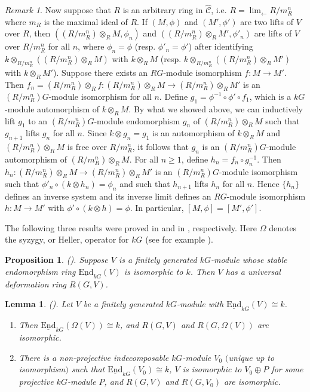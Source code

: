 \documentclass{amsart}
\theoremstyle{plain}
\newtheorem{prop}[thm]{Proposition}
\newtheorem{lemma}[thm]{Lemma}
\theoremstyle{definition}
\theoremstyle{remark}
\newtheorem{rem}[thm]{Remark}
\begin{document}
\begin{rem}
Now suppose that $R$ is an arbitrary ring in $\hat{\mathcal{C}}$, i.e.
$R=\displaystyle\lim_{\longleftarrow} R/m_R^n$ where $m_R$ is the
maximal ideal of $R$. If $(M,\phi)$ and $(M',\phi')$ are two lifts of $V$ over $R$, then
$((R/m_R^n)\otimes_RM,\phi_n)$ and $((R/m_R^n)\otimes_RM',\phi'_n)$ are lifts of $V$ over
$R/m_R^n$ for all $n$, where $\phi_n=\phi$ (resp. $\phi'_n=\phi'$)
after identifying $k\otimes_{R/m_R^n}((R/m_R^n)\otimes_R M)$ with $k\otimes_R M$ (resp.
$k\otimes_{R/m_R^n}((R/m_R^n)\otimes_R M')$ with $k\otimes_R M'$). 
Suppose there exists an $RG$-module isomorphism $f:M\to M'$. Then 
$f_n=(R/m_R^n)\otimes_Rf:(R/m_R^n)\otimes_RM\to (R/m_R^n)\otimes_RM'$ is an 
$(R/m_R^n)G$-module isomorphism for all $n$.
Define $g_1=\phi^{-1}\circ\phi'\circ f_1$, which is a $kG$-module automorphism of $k\otimes_RM$.
By what we showed above, we can inductively lift $g_1$ to an $(R/m_R^n)G$-module endomorphism
$g_n$ of $(R/m_R^n)\otimes_R M$ such that $g_{n+1}$ lifts $g_n$ for all $n$. Since $k\otimes g_n
=g_1$ is an automorphism of $k\otimes_R M$ and $(R/m_R^n)\otimes_R M$ is free over $R/m_R^n$, 
it follows that
$g_n$ is an $(R/m_R^n)G$-module automorphism of $(R/m_R^n)\otimes_R M$. For all $n\ge 1$, define
$h_n=f_n\circ g_n^{-1}$. Then $h_n: (R/m_R^n)\otimes_RM\to (R/m_R^n)\otimes_RM'$ is an 
$(R/m_R^n)G$-module isomorphism such that $\phi'_n\circ (k\otimes h_n)= \phi_n$
and such that $h_{n+1}$ lifts $h_n$ for all $n$. Hence $\{h_n\}$
defines an inverse system and its inverse limit defines an $RG$-module isomorphism
$h:M\to M'$ with $\phi'\circ (k\otimes h)=\phi$. In particular, $[M,\phi]=[M',\phi']$.
\end{rem}

The following three results were proved in \cite{bc} and in \cite{3sim}, respectively. 
Here $\Omega$ denotes
the syzygy, or Heller, operator for $kG$ (see for example \cite[\S 20]{alp}).

\begin{prop}
\label{prop:stablendudr}
{\rm (\cite[Prop. 2.1]{bc}).}
Suppose $V$ is a finitely generated $kG$-module whose stable endomorphism ring 
$\underline{\mathrm{End}}_{kG}(V)$ is isomorphic to $k$.  Then $V$ has  a universal 
deformation ring $R(G,V)$.
\end{prop}

\begin{lemma} 
\label{lem:defhelp}
{\rm (\cite[Cors. 2.5 and 2.8]{bc}).}
Let $V$ be a finitely generated $kG$-module with $\underline{\mathrm{End}}_{kG}(V)\cong k$.
\begin{enumerate}
\item[(i)] Then $\underline{\mathrm{End}}_{kG}(\Omega(V))\cong k$, and $R(G,V)$ and $R(G,\Omega(V))$ 
are isomorphic.
\item[(ii)] There is a non-projective indecomposable $kG$-module $V_0$ $($unique up to
isomorphism$)$ such that $\underline{\mathrm{End}}_{kG}(V_0)\cong k$, $V$ is isomorphic to 
$V_0\oplus P$ for some projective $kG$-module $P$, and $R(G,V)$ and $R(G,V_0)$ are 
isomorphic.
\end{enumerate}
\end{lemma}
\end{document}
